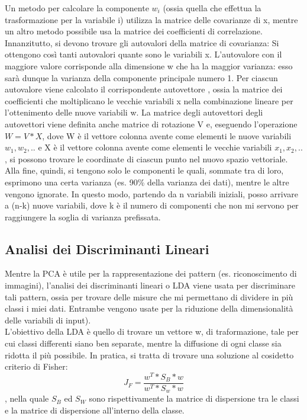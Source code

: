 Un metodo per calcolare la componente $w_i$ (ossia quella che effettua la trasformazione per la variabile i) utilizza la matrice delle covarianze di x, mentre un altro metodo possibile usa la matrice dei coefficienti di correlazione. Innanzitutto, si devono trovare gli autovalori della matrice di covarianza: Si ottengono così tanti autovalori quante sono le variabili x. L'autovalore con il maggiore valore corrisponde alla dimensione w che ha la maggior varianza: esso sarà dunque la varianza della componente principale numero 1. Per ciascun autovalore viene calcolato il corrispondente autovettore , ossia la matrice dei coefficienti che moltiplicano le vecchie variabili x nella combinazione lineare per l'ottenimento delle nuove variabili w. La matrice degli autovettori degli autovettori viene definita anche matrice di rotazione V e, eseguendo l'operazione $W = V*X $, dove W è il vettore colonna avente come elementi le nuove variabili $w_1,w_2,..$ e X è il vettore colonna avente come elementi le vecchie variabili $x_1,x_2,..$, si possono trovare le coordinate di ciascun punto nel nuovo spazio vettoriale. Alla fine, quindi, si tengono solo le componenti le quali, sommate tra di loro, esprimono una certa varianza (es. 90\% della varianza dei dati), mentre le altre vengono ignorate. In questo modo, partendo da n variabili iniziali, posso arrivare a (n-k) nuove variabili, dove k è il numero di componenti che non mi servono per raggiungere la soglia di varianza prefissata.
\subsection{Analisi dei Discriminanti Lineari}
Mentre la PCA è utile per la rappresentazione dei pattern (es. riconoscimento di immagini), l'analisi dei discriminanti lineari o LDA viene usata per discriminare tali pattern, ossia per trovare delle misure che mi permettano di dividere in più classi i miei dati. Entrambe vengono usate per la riduzione della dimensionalità delle variabili di input).\\
L'obiettivo della LDA è quello di trovare un vettore w, di traformazione, tale per cui classi differenti siano ben separate, mentre la diffusione di ogni classe sia ridotta il più possibile. In pratica, si tratta di trovare una soluzione al cosidetto criterio di Fisher: \[ J_F = \dfrac{w^T*S_B*w}{w^T*S_w*w}  \], nella quale $S_B$ ed $S_W$ sono rispettivamente la matrice di dispersione tra le classi e la matrice di dispersione all'interno della classe.